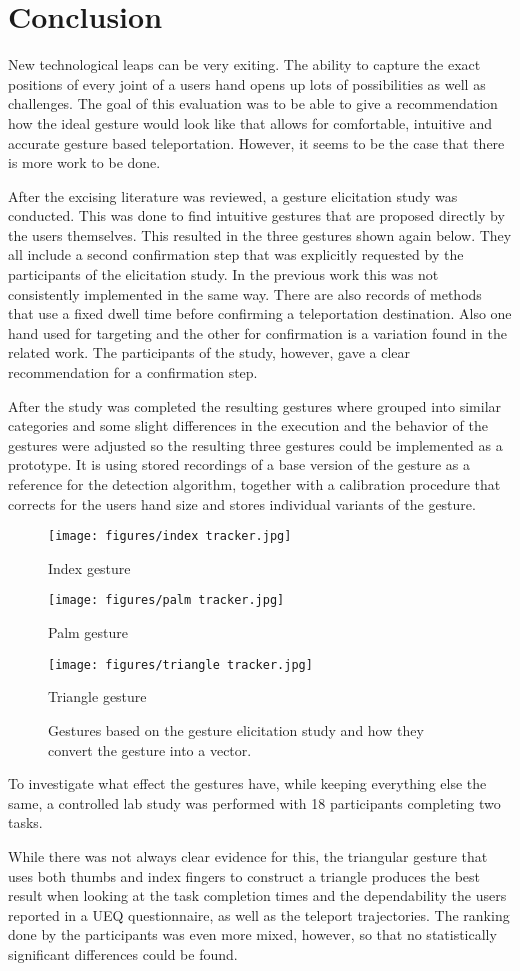 \chapter{Conclusion}

New technological leaps can be very exiting. The ability to capture the exact positions of every joint of a users hand opens up lots of possibilities as well as challenges. The goal of this evaluation was to be able to give a recommendation how the ideal gesture would look like that allows for comfortable, intuitive and accurate gesture based teleportation. However, it seems to be the case that there is more work to be done. 

After the excising literature was reviewed, a gesture elicitation study was conducted. This was done to find intuitive gestures that are proposed directly by the users themselves. This resulted in the three gestures shown again below. They all include a second confirmation step that was explicitly requested by the participants of the elicitation study. In the previous work this was not consistently implemented in the same way. There are also records of methods that use a fixed dwell time before confirming a teleportation destination. Also one hand used for targeting and the other for confirmation is a variation found in the related work. The participants of the study, however, gave a clear recommendation for a confirmation step. 

After the study was completed the resulting gestures where grouped into similar categories and some slight differences in the execution and the behavior of the gestures were adjusted so the resulting three gestures could be implemented as a prototype. It is using stored recordings of a base version of the gesture as a reference for the detection algorithm, together with a calibration procedure that corrects for the users hand size and stores individual variants of the gesture.

\begin{figure}[!h]
        \texttt{[image: figures/index tracker.jpg]}
        \caption{Index gesture}
    \endminipage\hfill
        \texttt{[image: figures/palm tracker.jpg]}
        \caption{Palm gesture}
    \endminipage
        \texttt{[image: figures/triangle tracker.jpg]}
        \caption{Triangle gesture}
    \endminipage
    \hfill
    \caption{Gestures based on the gesture elicitation study and how they convert the gesture into a vector.}
\end{figure}

To investigate what effect the gestures have, while keeping everything else the same, a controlled lab study was performed with 18 participants completing two tasks. 

While there was not always clear evidence for this, the triangular gesture that uses both thumbs and index fingers to construct a triangle produces the best result when looking at the task completion times and the dependability the users reported in a UEQ questionnaire, as well as the teleport trajectories. The ranking done by the participants was even more mixed, however, so that no statistically significant differences could be found. 
